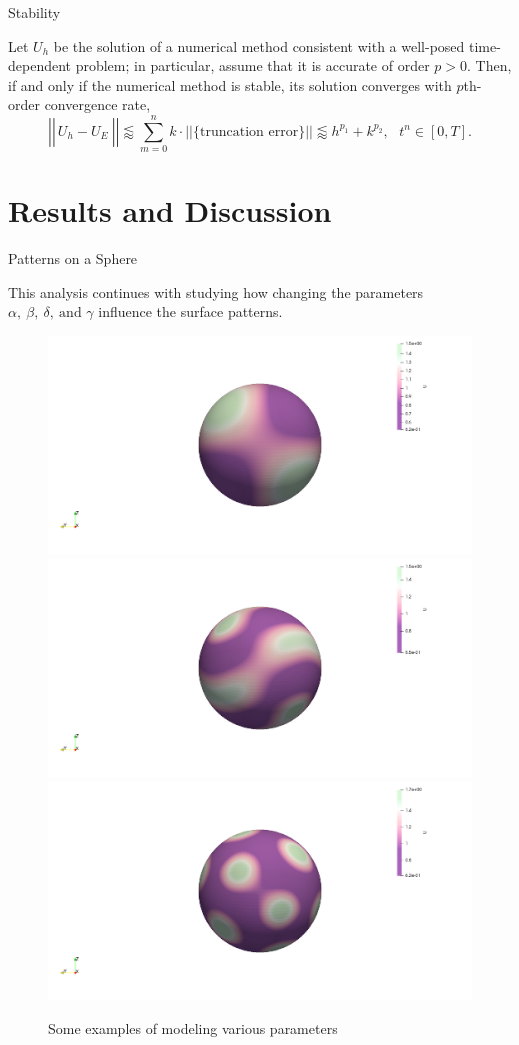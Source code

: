 \documentclass{beamer}
\begin{document}
		\begin{frame}{Stability}   
		
		\begin{theorem}
			Let $U_h$ be the solution of a numerical method consistent with a well-posed time-dependent problem; in particular, assume that it is accurate of order $p>0$. Then, if and only if the numerical method is stable, its solution converges with $p$th-order convergence rate,
			$$\left|\left|\frac{}{} U_h - U_E~\right|\right| \lessapprox \sum_{m=0}^n k\cdot ||\{\text{truncation error}\}|| \lessapprox h^{p_1} + k^{p_2}, ~~~t^n\in[0,T].$$
		\end{theorem}     
		
		\end{frame}
   
   \section[Discussion]{Results and Discussion}
   
   		\begin{frame}{Patterns on a Sphere}
   		
   		This analysis continues with studying how changing the parameters $\alpha,~ \beta, ~\delta, ~\text{and } \gamma$ influence the surface patterns.
   		
   		\vfill
   		
   			\begin{figure}[H]
   			\centering
   				\hspace*{\fill}\includegraphics[width=.32\linewidth, trim = 18cm 6cm 18cm 6cm, clip]{images/compare-g-40-r-10.png}
   				\hspace*{\fill}\includegraphics[width=.32\textwidth, trim = 18cm 6cm 18cm 6cm, clip]{images/compare-g-40-r-16.png}
   				\hspace*{\fill}\includegraphics[width=.32\textwidth, trim = 18cm 6cm 18cm 6cm, clip]{images/compare-g-40-r-20.png}
   				\caption{Some examples of modeling various parameters}
   		\end{figure}
   		\end{frame}
   	
\end{document}
